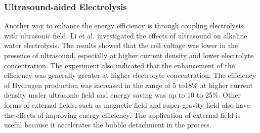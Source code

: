 \documentclass[11pt, a4paper]{article}
\begin{document}
\subsubsection{Ultrasound-aided Electrolysis}
Another way to enhance the energy efficiency is through coupling electrolysis with ultrasonic field. Li et al.\cite{ultrasound} investigated the effects of ultrasound on alkaline water electrolysis. The results showed that the cell voltage was lower in the presence of ultrasound,
especially at higher current density and lower electrolyte concentration. The experiment also indicated that the enhancement of the efficiency was generally greater at higher electrolyte concentration. The efficiency of Hydrogen production was increased in the range of 5 to18\% at higher current density under ultrasonic field and energy saving was up to 10 to 25\%. Other forms of external fields, such as magnetic field and super gravity field also have the effects of improving energy efficiency. The application of external field is useful because it accelerates the bubble detachment in the process. \cite{review}



\end{document}
